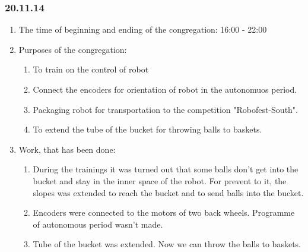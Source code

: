 \subsubsection{20.11.14}

\begin{enumerate}
	\item The time of beginning and ending of the congregation:
	16:00 - 22:00
	\item Purposes of the congregation:
	\begin{enumerate}
	  \item To train on the control of robot
	  
	  \item Connect the encoders for orientation of robot in the autonomuos period.
	  
	  \item Packaging robot for transportation to the competition "Robofest-South".
	  
	  \item To extend the tube of the bucket for throwing balls to baskets.
	  
    \end{enumerate}
	\item Work, that has been done:
	\begin{enumerate}
	  \item During the trainings it was turned out that some balls don't get into the bucket and stay in the inner space of the robot. For prevent to it, the slopes was extended to reach the bucket and to send balls into the bucket.
	  
      
      \item Encoders were connected to the motors of two back wheels. Programme of autonomous period wasn't made.
      
      \item Tube of the bucket was extended. Now we can throw the balls to baskets.
      

\end{enumerate}
\end{enumerate}
